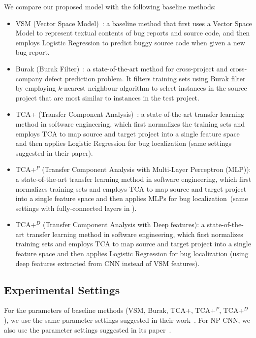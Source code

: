 We compare our proposed model \TRANPCNN with the following baseline methods:
\begin{itemize}
  \item VSM (Vector Space Model)~\cite{rao2011retrieval}: a baseline method that first uses a Vector Space Model to represent textual contents of bug reports and source code, and then employs Logistic Regression to predict buggy source code when given a new bug report.
  \item Burak (Burak Filter)~\cite{peters2013better}: a state-of-the-art method for cross-project and cross-company defect prediction problem. It filters training sets using Burak filter by employing $k$-nearest neighbour algorithm to select instances in the source project that are most similar to instances in the test project.
  \item TCA+ (Transfer Component Analysis)~\cite{NamPK13}: a state-of-the-art transfer learning method in software engineering, which first normalizes the training sets and employs TCA to map source and target project into a single feature space and then applies Logistic Regression for bug localization (same settings suggested in their paper). 
  \item TCA+$^P$ (Transfer Component Analysis with Multi-Layer Perceptron (MLP)): a state-of-the-art transfer learning method in software engineering, which first normalizes training sets and employs TCA to map source and target project into a single feature space and then applies MLPs for bug localization~(same settings with fully-connected layers in \TRANPCNN).
   \item TCA+$^D$ (Transfer Component Analysis with Deep features): a state-of-the-art transfer learning method in software engineering, which first normalizes training sets and employs TCA to map source and target project into a single feature space and then applies Logistic Regression for bug localization (using deep features extracted from CNN instead of VSM features).
\end{itemize}

\subsection{Experimental Settings}
For the parameters of baseline methods (VSM, Burak, TCA+, TCA+$^{P}$, TCA+$^{D}$), we use the same parameter settings suggested in their work~\cite{rao2011retrieval,NamPK13}. For NP-CNN, we also use the parameter settings suggested in its paper~\cite{huo2016learning}.

